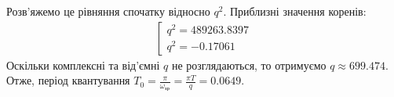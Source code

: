 Розв'яжемо це рівняння спочатку відносно $q^2$. Приблизні значення коренів: 
\begin{gather*}
    \left[
        \begin{array}{ll}
            q^2 = 489263.8397 \\
            q^2 = -0.17061
        \end{array}
    \right.
\end{gather*}
Оскільки комплексні та від'ємні $q$ не розглядаються, то отримуємо $q \approx 699.474$.
Отже, період квантування $T_0 = \frac{\pi}{\omega_{\text{зр}}} = 
\frac{\pi T}{q} = 0.0649$.